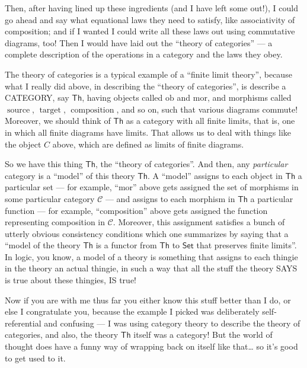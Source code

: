 \documentclass{article}
\begin{document}
Then, after having lined up these ingredients (and I have left some
out!), I could go ahead and say what equational laws they need to
satisfy, like associativity of composition; and if I wanted I could
write all these laws out using commutative diagrams, too! Then I would
have laid out the ``theory of categories'' --- a complete description of
the operations in a category and the laws they obey.

The theory of categories is a typical example of a ``finite limit
theory'', because what I really did above, in describing the ``theory of
categories'', is describe a CATEGORY, say \(\mathsf{Th}\), having
objects called \(\mathrm{ob}\) and \(\mathrm{mor}\), and morphisms
called \(\operatorname{source}\), \(\operatorname{target}\),
\(\operatorname{composition}\), and so on, such that various diagrams
commute! Moreover, we should think of \(\mathsf{Th}\) as a category with
all finite limits, that is, one in which all finite diagrams have
limits. That allows us to deal with things like the object \(C\) above,
which are defined as limits of finite diagrams.

So we have this thing \(\mathsf{Th}\), the ``theory of categories''. And
then, any \emph{particular} category is a ``model'' of this theory
\(\mathsf{Th}\). A ``model'' assigns to each object in \(\mathsf{Th}\) a
particular set --- for example, ``mor'' above gets assigned the set of
morphisms in some particular category \(\mathcal{C}\) --- and assigns to
each morphism in \(\mathsf{Th}\) a particular function --- for example,
``composition'' above gets assigned the function representing
composition in \(\mathcal{C}\). Moreover, this assignment satisfies a
bunch of utterly obvious consistency conditions which one summarizes by
saying that a ``model of the theory \(\mathsf{Th}\) is a functor from
\(\mathsf{Th}\) to \(\mathsf{Set}\) that preserves finite limits''. In
logic, you know, a model of a theory is something that assigns to each
thingie in the theory an actual thingie, in such a way that all the
stuff the theory SAYS is true about these thingies, IS true!

Now if you are with me thus far you either know this stuff better than I
do, or else I congratulate you, because the example I picked was
deliberately self-referential and confusing --- I was using category
theory to describe the theory of categories, and also, the theory
\(\mathsf{Th}\) itself was a category! But the world of thought does
have a funny way of wrapping back on itself like that\ldots{} so it's
good to get used to it.
\end{document}
